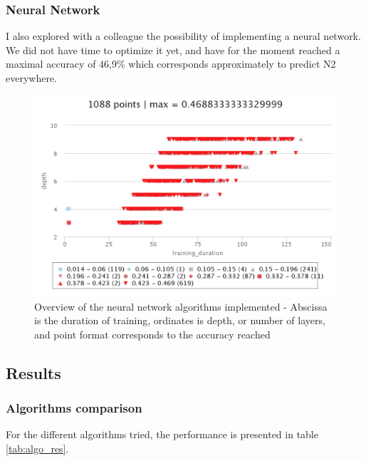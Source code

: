 \documentclass[12pt]{report}
\begin{document}
\subsubsection{Neural Network}

I also explored with a colleague the possibility of implementing a neural network. We did not have time to optimize it yet, and have for the moment reached a maximal accuracy of 46,9\% which corresponds approximately to predict N2 everywhere.

 \begin{figure}[H]
 \centering
 \includegraphics[width=.5\textwidth]{img/chap2/neural_net.png}
 \caption{\label{fig:neural_net}Overview of the neural network algorithms implemented - Abscissa is the duration of training, ordinates is depth, or number of layers, and point format corresponds to the accuracy reached}
 \end{figure}

\subsection{Results}

\subsubsection{Algorithms comparison}

For the different algorithms tried, the performance is presented in table \ref{tab:algo_res}.
\end{document}
